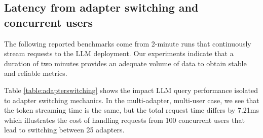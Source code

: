 \subsection{Latency from adapter switching and concurrent users}

The following reported benchmarks come from 2-minute runs that continuously stream requests to the LLM deployment. Our experiments indicate that a duration of two minutes provides an adequate volume of data to obtain stable and reliable metrics.

Table \ref{table:adapterswitching} shows the impact LLM query performance isolated to adapter switching mechanics. In the multi-adapter, multi-user case, we see that the token streaming time is the same, but the total request time differs by 7.21ms which illustrates the cost of handling requests from 100 concurrent users that lead to switching between 25 adapters.

\begin{table}[ht]
\centering


\caption{Measuring LLM querying metrics from adapter switching mechanics only. To eliminate extra, non-adapter-switching factors related to input and generation, simulated requests contain 1 input token and \textit{max\_new\_tokens} is capped at 1. Throughput metrics are excluded since only 1 output token is generated. \label{table:adapterswitching}}
\end{table}


